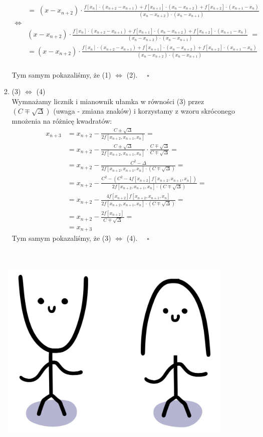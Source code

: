 \documentclass[12pt]{article}
\newcommand{\0}{x_{n}}
\newcommand{\1}{x_{n+1}}
\newcommand{\2}{x_{n+2}}
\newcommand{\3}{x_{n+3}}
\begin{document}
\begin{enumerate}[1.]
\begin{enumerate}[$\bullet$]
\begin{align*}
&= \; \scriptstyle (x - \2) \cdot \frac{f[\0] \cdot (\2 - \1) + f[\1] \cdot (\0 - \2) + f[\2] \cdot (\1 - \0)}{(\0 - \2) \cdot (\0 - \1)} \\
\Leftrightarrow & \\
& (x - \2) \cdot \frac{f[\0] \cdot (\2 - \1) + f[\1] \cdot (\0 - \2) + f[\2] \cdot (\1 - \0)}{(\0 - \2) \cdot (\0 - \1)}\; = \\[1ex]
&= (x - \2) \cdot \frac{f[\0] \cdot (\2 - \1) + f[\1] \cdot (\0 - \2) + f[\2] \cdot (\1 - \0)}{(\0 - \2) \cdot (\0 - \1)}
\end{align*}\\
Tym samym pokazaliśmy, że (1) $\Leftrightarrow$ (2). $\quad \square$
\pagebreak
\newpage
\item (3) $\Leftrightarrow$ (4) \medskip \\
Wymnażamy licznik i mianownik ułamka w równości (3) przez $(C \mp \sqrt{\Delta})$ (uwaga - zmiana znaków) i korzystamy z wzoru skróconego mnożenia na różnicę kwadratów:
\begin{align*}
\3 &= \2 - \frac{C \pm \sqrt{\Delta}}{2f[\2, \1, \0]} =\\[1ex]
&= \2 - \frac{C \pm \sqrt{\Delta}}{2f[\2, \1, \0]} \cdot \frac{C \mp \sqrt{\Delta}}{C \mp \sqrt{\Delta}} =\\[1ex]
&= \2 - \frac{C^2 - \Delta}{2f[\2, \1, \0] \cdot (C \mp \sqrt{\Delta})} =\\[1ex]
&= \2 - \frac{C^2 - \left(C^2 - 4f[\2]f[\2, \1, \0]\right)}{2f[\2, \1, \0] \cdot (C \mp \sqrt{\Delta})} =\\[1ex]
&= \2 - \frac{4f[\2]f[\2, \1, \0]}{2f[\2, \1, \0] \cdot (C \mp \sqrt{\Delta})} =\\[1ex]
&= \2 - \frac{2f[\2]}{C \mp \sqrt{\Delta}} =\\[1ex]
&= \3
\end{align*}
Tym samym pokazaliśmy, że (3) $\Leftrightarrow$ (4). $\quad \square$ \\\\\\
\end{enumerate}
\end{enumerate}
\begin{figure}[H]
\centering
\href{https://www.youtube.com/watch?v=AGA_1HsP_C0&ab_channel=damaziom1}{\includegraphics[scale=0.25]{parabole.png}}
\end{figure}
\end{document}
